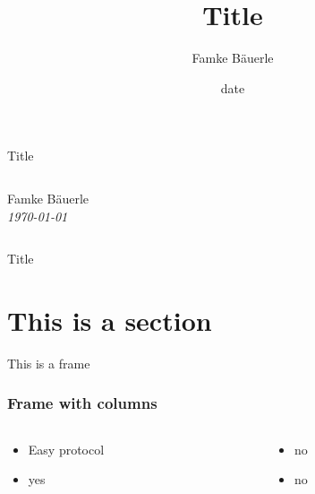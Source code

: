 \documentclass[aspectratio=169]{beamer}
\title{Title}
\author{Famke Bäuerle}
\date{date}
\begin{document}
\begin{frame}[plain]
\vspace{.7cm}
\centering
\begin{tcolorbox}[colback=karminrot!100!white, coltext=white!100!white]
	\begin{center}
		{\huge Title}\\
	\end{center}
\end{tcolorbox}
\vspace{.3cm}
\begin{columns}[c]
\begin{column}{.5\textwidth}
\begin{center}
\textcolor{anthrazit}{Famke Bäuerle}\\
\vspace{.5cm}
{\large \textcolor{anthrazit}{\textit{\today}}}
\end{center}
\end{column}
\begin{column}{.5\textwidth}
\tableofcontents
\end{column}
\end{columns}
\vspace{1cm}
\textcolor{anthrazit}{Title}
\\\vspace{.5cm}
\end{frame}

\section[Short]{This is a section}

\begin{frame}
This is a frame
\end{frame}

\begin{frame}
    \frametitle{Frame with columns}
        \begin{columns}[t]
            \begin{column}{.5\textwidth}
                \begin{itemize}
                    \item<2-> Easy protocol
                    \item<3-> yes
                \end{itemize}
            \end{column}
            \begin{column}{.5\textwidth}
                \begin{itemize}
                    \item<4-> no
                    \item<5-> no
                \end{itemize}
            \end{column}
        \end{columns}
    \blfootnote{\textcolor{darkgray}{Source}}
\end{frame}
\end{document}
